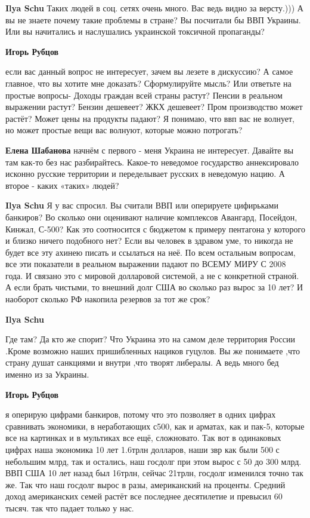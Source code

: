 \begin{itemize}
\begin{itemize}
\textbf{Ilya Schu} Таких людей в соц. сетях очень много. Вас ведь видно за версту.))) А вы не знаете почему такие проблемы в стране? Вы посчитали бы ВВП Украины. Или вы начитались и наслушались украинской токсичной пропаганды?

\textbf{Игорь Рубцов} 

если вас данный вопрос не интересует, зачем вы лезете в дискуссию? А самое
главное, что вы хотите мне доказать? Сформулируйте мысль? Или ответьте на
простые вопросы- Доходы граждан всей страны растут? Пенсии в реальном выражении
растут? Бензин дешевеет? ЖКХ дешевеет? Пром производство может растёт? Может
цены на продукты падают? Я понимаю, что ввп вас не волнует, но может простые
вещи вас волнуют, которые можно потрогать?


\textbf{Елена Шабанова} начнём с первого - меня Украина не интересует. Давайте вы там как-то без нас разбирайтесь. Какое-то неведомое государство аннексировало исконно русские территории и переделывает русских в неведомую нацию. А второе - каких «таких» людей?

\textbf{Ilya Schu}
Я у вас спросил. Вы считали ВВП или оперируете цифирьками банкиров?
Во сколько они оценивают наличие комплексов Авангард, Посейдон, Кинжал, С-500? Как это соотносится с бюджетом к примеру пентагона у которого и близко ничего подобного нет?
Если вы человек в здравом уме, то никогда не будет все эту ахинею писать и ссылаться на неё.
По всем остальным вопросам, все эти показатели в реальном выражении падают по ВСЕМУ МИРУ С 2008 года.
И связано это с мировой долларовой системой, а не с конкретной страной.
А если брать чистыми, то внешний долг США во сколько раз вырос за 10 лет?
И наоборот сколько РФ накопила резервов за тот же срок?

\textbf{Ilya Schu} 

Где там? Да кто же спорит? Что Украина это на самом деле территория России .Кроме
возможно наших пришибленных нациков гуцулов. Вы же понимаете ,что страну душат
санкциями и внутри ,что творят либералы. А ведь много бед именно из за Украины.


\textbf{Игорь Рубцов} 

я оперирую цифрами банкиров, потому что это позволяет в одних цифрах сравнивать
экономики, в неработающих с500, как и арматах, как и пак-5, которые все на
картинках и в мультиках все ещё, сложновато. Так вот в одинаковых цифрах наша
экономика 10 лет 1.6трлн долларов, наши звр как были 500 с небольшим млрд, так
и остались, наш госдолг при этом вырос с 50 до 300 млрд. ВВП США 10 лет назад
был 16трлн, сейчас 21трлн, госдолг изменился точно так же. Так что наш госдолг
вырос в разы, американский на проценты. Средний доход американских семей растёт
все последнее десятилетие и превысил 60 тысяч. так что падает только у нас.


\end{itemize}
\end{itemize}
